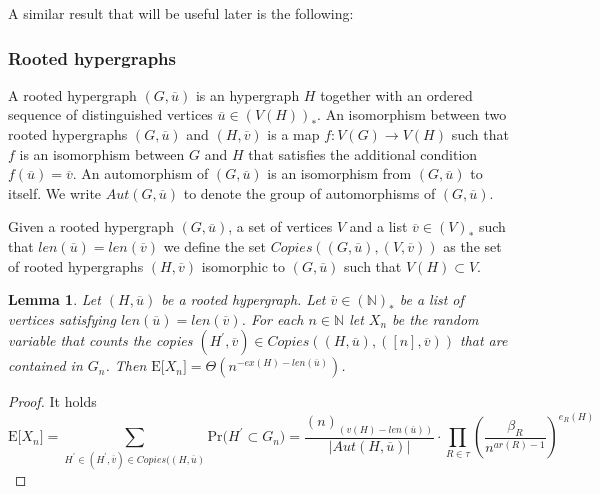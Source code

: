 \documentclass[12pt,notitlepage,a4paper]{article}
\newtheorem{lemma}{Lemma}[section]
\theoremstyle{definition}
\newcommand{\N}{\mathbb{N}}
\newcommand{\PR}[1]{\mathrm{Pr}\big(#1\big)}
\begin{document}
A similar result that will be useful later is the following:

\subsubsection{Rooted hypergraphs}

A rooted hypergraph $(G,\overline{u})$ is an hypergraph $H$ together with 
an ordered sequence of distinguished vertices $\overline{u}\in (V(H))_*$.
An isomorphism between two rooted hypergraphs $(G,\overline{u})$ and
$(H,\overline{v})$ is a map $f: V(G)\rightarrow V(H)$ such that $f$
is an isomorphism between $G$ and $H$ that satisfies the additional condition
$f(\overline{u})=\overline{v}$. An automorphism of $(G,\overline{u})$  is 
an isomorphism from $(G,\overline{u})$  to itself. 
We write $Aut(G,\overline{u})$ to denote the group
of automorphisms of $(G,\overline{u})$. \par

Given a rooted hypergraph $(G,\overline{u})$, a set of vertices
$V$ and a list $\overline{v}\in (V)_*$ such that $len(\overline{u})
= len(\overline{v})$ we define the set $Copies((G,\overline{u}),
(V,\overline{v}))$ as the set of rooted hypergraphs 
$(H,\overline{v})$ isomorphic to $(G,\overline{u})$ such that
$V(H)\subset V$. \par

\begin{lemma}\label{lem:nocopiesfixed}
	Let $(H,\overline{u})$ be a rooted hypergraph. Let
	$\overline{v}\in (\N)_*$ be a list of vertices satisfying
	$len(\overline{u})=len(\overline{v})$. For each $n\in \N$ 
	let $X_n$ be the random variable that
	counts the copies $(H^\prime,\overline{v})\in
	Copies((H,\overline{u}),
	([n],\overline{v}))$ that are contained in $G_n$. Then
	$\mathrm{E}\big[ X_n \big]=\Theta(n^{-ex(H)-len(\overline{u})})$.	
\end{lemma}
\begin{proof}
	It holds
	\[
	\mathrm{E}\big[ X_n \big]=\sum_{H^\prime\in (H^\prime,\overline{v})\in
		Copies((H,\overline{u})} \PR{H^\prime \subset G_n}
	= \frac{(n)_{(v(H)-len(\overline{u}))}}{|Aut(H,\overline{u})|} 
	\cdot\prod_{R\in\tau} \left( \frac{\beta_R}{n^{ar(R)-1}}\right)^{e_R(H)}
	\]
\end{proof}
\end{document}
